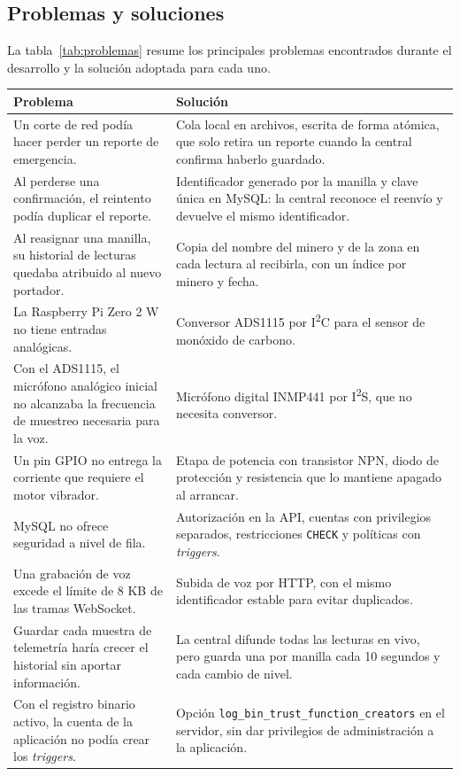 \documentclass[10pt,a4paper]{article}
\newcommand{\code}[1]{{\small\urlstyle{tt}\nolinkurl{#1}}}
\begin{document}
\subsection{Problemas y soluciones}
La tabla~\ref{tab:problemas} resume los principales problemas encontrados durante el desarrollo y la solución adoptada para cada uno.

\label{tab:problemas}
\begin{tabularx}{\linewidth}{@{}P{62mm}Y@{}}
\toprule\textbf{Problema} & \textbf{Solución}\\\midrule
Un corte de red podía hacer perder un reporte de emergencia. & Cola local en archivos, escrita de forma atómica, que solo retira un reporte cuando la central confirma haberlo guardado.\\
Al perderse una confirmación, el reintento podía duplicar el reporte. & Identificador generado por la manilla y clave única en MySQL: la central reconoce el reenvío y devuelve el mismo identificador.\\
Al reasignar una manilla, su historial de lecturas quedaba atribuido al nuevo portador. & Copia del nombre del minero y de la zona en cada lectura al recibirla, con un índice por minero y fecha.\\
La Raspberry Pi Zero 2 W no tiene entradas analógicas. & Conversor ADS1115 por I\textsuperscript{2}C para el sensor de monóxido de carbono.\\
Con el ADS1115, el micrófono analógico inicial no alcanzaba la frecuencia de muestreo necesaria para la voz. & Micrófono digital INMP441 por I\textsuperscript{2}S, que no necesita conversor.\\
Un pin GPIO no entrega la corriente que requiere el motor vibrador. & Etapa de potencia con transistor NPN, diodo de protección y resistencia que lo mantiene apagado al arrancar.\\
MySQL no ofrece seguridad a nivel de fila. & Autorización en la API, cuentas con privilegios separados, restricciones \code{CHECK} y políticas con \emph{triggers}.\\
Una grabación de voz excede el límite de 8 KB de las tramas WebSocket. & Subida de voz por HTTP, con el mismo identificador estable para evitar duplicados.\\
Guardar cada muestra de telemetría haría crecer el historial sin aportar información. & La central difunde todas las lecturas en vivo, pero guarda una por manilla cada 10 segundos y cada cambio de nivel.\\
Con el registro binario activo, la cuenta de la aplicación no podía crear los \emph{triggers}. & Opción \code{log_bin_trust_function_creators} en el servidor, sin dar privilegios de administración a la aplicación.\\\bottomrule
\end{tabularx}
\end{document}
